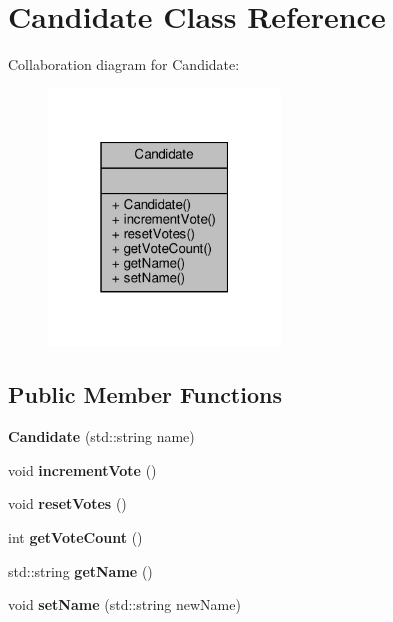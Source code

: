 \hypertarget{classCandidate}{}\section{Candidate Class Reference}
\label{classCandidate}


Collaboration diagram for Candidate\+:
\nopagebreak
\begin{figure}[H]
\begin{center}
\leavevmode
\includegraphics[width=175pt]{classCandidate__coll__graph}
\end{center}
\end{figure}
\subsection*{Public Member Functions}
\begin{DoxyCompactItemize}
\item 
\mbox{\label{classCandidate_a99c1eda1eeecf4bbd054049449954c90}} 
{\bfseries Candidate} (std\+::string name)
\item 
\mbox{\label{classCandidate_aebdd30b267da46060d03374cc76c2603}} 
void {\bfseries increment\+Vote} ()
\item 
\mbox{\label{classCandidate_a2d4e7b4d2e0d32468688e5e4c2c9b098}} 
void {\bfseries reset\+Votes} ()
\item 
\mbox{\label{classCandidate_acce26ecaedcc448a3c90b9af5f45dea6}} 
int {\bfseries get\+Vote\+Count} ()
\item 
\mbox{\label{classCandidate_af862d92e21d66d74f1d5cae92937d3da}} 
std\+::string {\bfseries get\+Name} ()
\item 
\mbox{\label{classCandidate_afd7bc6e324ab669a9440778680a0a5d3}} 
void {\bfseries set\+Name} (std\+::string new\+Name)
\end{DoxyCompactItemize}
